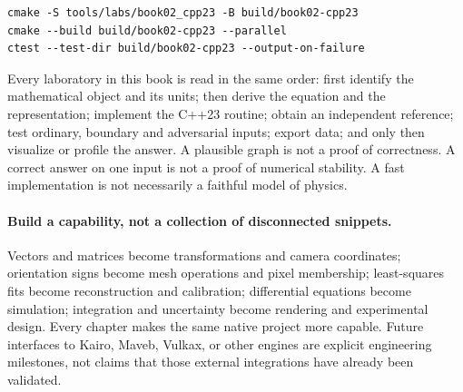 \begin{Shaded}
\begin{verbatim}
cmake -S tools/labs/book02_cpp23 -B build/book02-cpp23
cmake --build build/book02-cpp23 --parallel
ctest --test-dir build/book02-cpp23 --output-on-failure
\end{verbatim}
\end{Shaded}

Every laboratory in this book is read in the same order: first identify
the mathematical object and its units; then derive the equation and the
representation; implement the C++23 routine; obtain an independent
reference; test ordinary, boundary and adversarial inputs; export data;
and only then visualize or profile the answer. A plausible graph is not
a proof of correctness. A correct answer on one input is not a proof of
numerical stability. A fast implementation is not necessarily a faithful
model of physics.

\paragraph{Build a capability, not a collection of disconnected snippets.}
Vectors and matrices become transformations and camera coordinates;
orientation signs become mesh operations and pixel membership;
least-squares fits become reconstruction and calibration; differential
equations become simulation; integration and uncertainty become
rendering and experimental design. Every chapter makes the same native
project more capable. Future interfaces to Kairo, Maveb, Vulkax, or other
engines are explicit engineering milestones, not claims that those
external integrations have already been validated.
